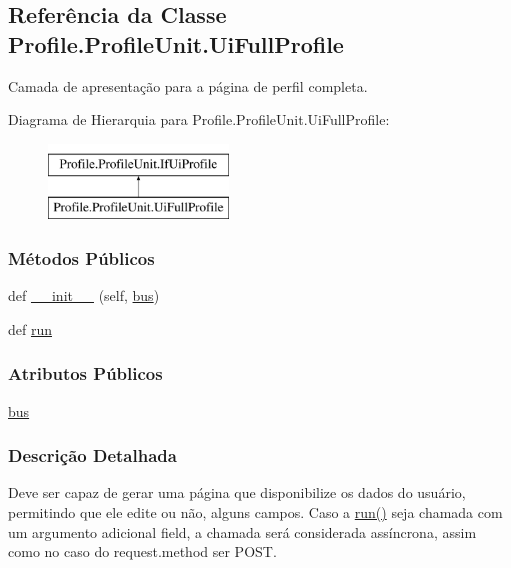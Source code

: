 \hypertarget{classProfile_1_1ProfileUnit_1_1UiFullProfile}{}\subsection{Referência da Classe Profile.\+Profile\+Unit.\+Ui\+Full\+Profile}
\label{classProfile_1_1ProfileUnit_1_1UiFullProfile}


Camada de apresentação para a página de perfil completa.  


Diagrama de Hierarquia para Profile.\+Profile\+Unit.\+Ui\+Full\+Profile\+:\begin{figure}[H]
\begin{center}
\leavevmode
\includegraphics[height=2.000000cm]{db/d57/classProfile_1_1ProfileUnit_1_1UiFullProfile}
\end{center}
\end{figure}
\subsubsection*{Métodos Públicos}
\begin{DoxyCompactItemize}
\item 
def \hyperlink{classProfile_1_1ProfileUnit_1_1UiFullProfile_adf6a5ba4144b085d75c938def4c1374a}{\+\_\+\+\_\+init\+\_\+\+\_\+} (self, \hyperlink{classProfile_1_1ProfileUnit_1_1UiFullProfile_a47049f3f61c7fada93dd84fccd19a2bd}{bus})
\item 
def \hyperlink{classProfile_1_1ProfileUnit_1_1UiFullProfile_a7a7747246b627020a345f7a3eac27778}{run}
\end{DoxyCompactItemize}
\subsubsection*{Atributos Públicos}
\begin{DoxyCompactItemize}
\item 
\hyperlink{classProfile_1_1ProfileUnit_1_1UiFullProfile_a47049f3f61c7fada93dd84fccd19a2bd}{bus}
\end{DoxyCompactItemize}


\subsubsection{Descrição Detalhada}
Deve ser capaz de gerar uma página que disponibilize os dados do usuário, permitindo que ele edite ou não, alguns campos. Caso a \hyperlink{classProfile_1_1ProfileUnit_1_1UiFullProfile_a7a7747246b627020a345f7a3eac27778}{run()} seja chamada com um argumento adicional field, a chamada será considerada assíncrona, assim como no caso do request.\+method ser P\+O\+S\+T. 

